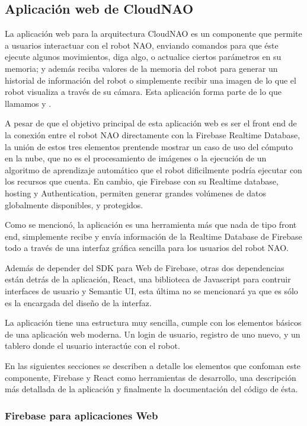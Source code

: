 
\subsection{Aplicación web de CloudNAO}
\label{\detokenize{nao_web:introduccion}}
La aplicación web para la arquitectura CloudNAO es un componente que permite a
usuarios interactuar con el robot NAO, enviando comandos para que éste ejecute
algunos movimientos, diga algo, o actualice ciertos parámetros en su memoria;
y además reciba valores de la memoria del robot para generar un historial
de información del robot o simplemente recibir una imagen de lo que el robot
visualiza a través de su cámara. Esta aplicación forma parte de lo que
llamamos  y .

A pesar de que el objetivo principal de esta aplicación web es ser el
front end de la conexión entre el robot NAO directamente con la Firebase
Realtime Database, la unión de estos tres elementos prentende
mostrar un caso de uso del cómputo en la nube, que no es el procesamiento de
imágenes o la ejecución de un algoritmo de aprendizaje automático que el robot
dificilmente podría ejecutar con los recursos que cuenta. En cambio,
qie Firebase con su Realtime database, hosting y Authentication, permiten
generar grandes volúmenes de datos globalmente disponibles, y protegidos.

Como se mencionó, la aplicación es una herramienta más que nada de tipo
front end, simplemente recibe y envía información de la Realtime Database de
Firebase todo a través de una interfaz gráfica sencilla para los usuarios
del robot NAO.

Además de depender del SDK para Web de Firebase, otras dos dependencias están
detrás de la aplicación, React, una biblioteca de Javascript para contruir
interfaces de usuario y Semantic UI, esta última no se mencionará ya que
es sólo es la encargada del diseño de la interfaz.

La aplicación tiene una estructura muy sencilla, cumple con los elementos
básicos de una aplicación web moderna. Un login de usuario, registro de uno
nuevo, y un tablero donde el usuario interactúe con el robot.

En las siguientes secciones se describen a detalle los elementos que confoman
este componente, Firebase y React como herramientas de desarrollo,
una descripción más detallada de la aplicación y finalmente la documentación
del código de ésta.


\subsubsection{Firebase para aplicaciones Web}
\label{\detokenize{firebase_web:firebase-para-aplicaciones-web}}\label{\detokenize{firebase_web::doc}}

